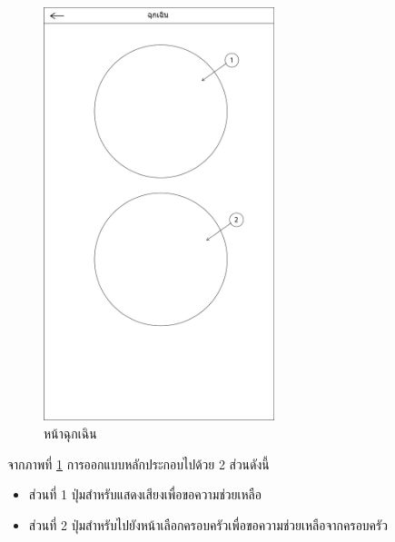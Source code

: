 		\begin{figure}[H]
			\centering
			\includegraphics[width=0.6\textwidth]{Figures/3/UI/help}
			\caption{หน้าฉุกเฉิน}
			\label{Fig:ฉุกเฉิน}
		\end{figure}
		จากภาพที่ \ref{Fig:ฉุกเฉิน} การออกแบบหลักประกอบไปด้วย 2 ส่วนดังนี้
		\begin{itemize}
			\item ส่วนที่ 1 ปุ่มสำหรับแสดงเสียงเพื่อขอความช่วยเหลือ
			\item ส่วนที่ 2 ปุ่มสำหรับไปยังหน้าเลือกครอบครัวเพื่อขอความช่วยเหลือจากครอบครัว
		\end{itemize}

